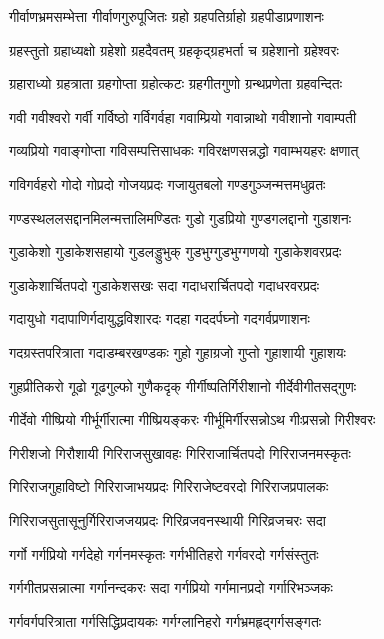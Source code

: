 \twolineshloka
{गीर्वाणभ्रमसम्भेत्ता गीर्वाणगुरुपूजितः}%
{ग्रहो ग्रहपतिर्ग्राहो ग्रहपीडाप्रणाशनः}%

\twolineshloka
{ग्रहस्तुतो ग्रहाध्यक्षो ग्रहेशो ग्रहदैवतम्}%
{ग्रहकृद्ग्रहभर्ता च ग्रहेशानो ग्रहेश्वरः}%

\twolineshloka
{ग्रहाराध्यो ग्रहत्राता ग्रहगोप्ता ग्रहोत्कटः}%
{ग्रहगीतगुणो ग्रन्थप्रणेता ग्रहवन्दितः}%

\twolineshloka
{गवी गवीश्वरो गर्वी गर्विष्ठो गर्विगर्वहा}%
{गवाम्प्रियो गवान्नाथो गवीशानो गवाम्पती}%

\twolineshloka
{गव्यप्रियो गवाङ्गोप्ता गविसम्पत्तिसाधकः}%
{गविरक्षणसन्नद्धो गवाम्भयहरः क्षणात्}%

\twolineshloka
{गविगर्वहरो गोदो गोप्रदो गोजयप्रदः}%
{गजायुतबलो गण्डगुञ्जन्मत्तमधुव्रतः}%

\twolineshloka
{गण्डस्थललसद्दानमिलन्मत्तालिमण्डितः}%
{गुडो गुडप्रियो गुण्डगलद्दानो गुडाशनः}%

\twolineshloka
{गुडाकेशो गुडाकेशसहायो गुडलड्डुभुक्}%
{गुडभुग्गुडभुग्गणयो गुडाकेशवरप्रदः}%

\twolineshloka
{गुडाकेशार्चितपदो गुडाकेशसखः सदा}%
{गदाधरार्चितपदो गदाधरवरप्रदः}%

\twolineshloka
{गदायुधो गदापाणिर्गदायुद्धविशारदः}%
{गदहा गददर्पघ्नो गदगर्वप्रणाशनः}%

\twolineshloka
{गदग्रस्तपरित्राता गदाडम्बरखण्डकः}%
{गुहो गुहाग्रजो गुप्तो गुहाशायी गुहाशयः}%

\twolineshloka
{गुहप्रीतिकरो गूढो गूढगुल्फो गुणैकदृक्}%
{गीर्गीष्पतिर्गिरीशानो गीर्देवीगीतसद्गुणः}%

\twolineshloka
{गीर्देवो गीष्प्रियो गीर्भूर्गीरात्मा गीष्प्रियङ्करः}%
{गीर्भूमिर्गीरसन्नोऽथ गीःप्रसन्नो गिरीश्वरः}%

\twolineshloka
{गिरीशजो गिरौशायी गिरिराजसुखावहः}%
{गिरिराजार्चितपदो गिरिराजनमस्कृतः}%

\twolineshloka
{गिरिराजगुहाविष्टो गिरिराजाभयप्रदः}%
{गिरिराजेष्टवरदो गिरिराजप्रपालकः}%

\twolineshloka
{गिरिराजसुतासूनुर्गिरिराजजयप्रदः}%
{गिरिव्रजवनस्थायी गिरिव्रजचरः सदा}%

\twolineshloka
{गर्गो गर्गप्रियो गर्गदेहो गर्गनमस्कृतः}%
{गर्गभीतिहरो गर्गवरदो गर्गसंस्तुतः}%

\twolineshloka
{गर्गगीतप्रसन्नात्मा गर्गानन्दकरः सदा}%
{गर्गप्रियो गर्गमानप्रदो गर्गारिभञ्जकः}%

\twolineshloka
{गर्गवर्गपरित्राता गर्गसिद्धिप्रदायकः}%
{गर्गग्लानिहरो गर्गभ्रमहृद्गर्गसङ्गतः}%

